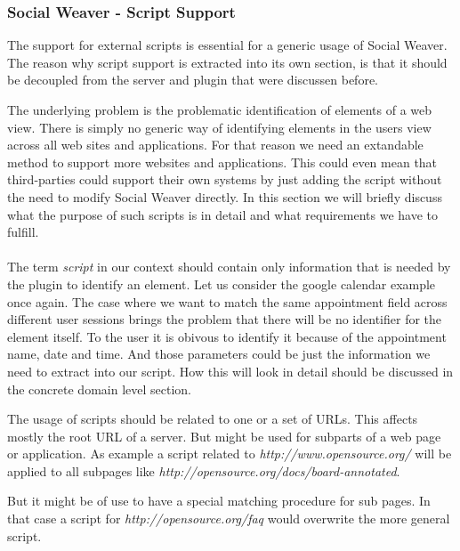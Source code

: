 
\subsubsection{Social Weaver - Script Support}
The support for external scripts is essential for a generic usage of Social Weaver. The reason why script support is extracted into its own section, is that it should be decoupled from the server and plugin that were discussen before. 

The underlying problem is the problematic identification of elements of a web view. There is simply no generic way of identifying elements in the users view across all web sites and applications. For that reason we need an extandable method to support more websites and applications. This could even mean that third-parties could support their own systems by just adding the script without the need to modify Social Weaver directly. In this section we will briefly discuss what the purpose of such scripts is in detail and what requirements we have to fulfill. 
\\ \\
The term \textit{script} in our context should contain only information that is needed by the plugin to identify an element. Let us consider the google calendar example once again. The case where we want to match the same appointment field across different user sessions brings the problem that there will be no identifier for the element itself. To the user it is obivous to identify it because of the appointment name, date and time. And those parameters could be just the information we need to extract into our script. How this will look in detail should be discussed in the concrete domain level section. 

The usage of scripts should be related to one or a set of URLs. This affects mostly the root URL of a server. But might be used for subparts of a web page or application. As example a script related to \textit{http://www.opensource.org/} will be applied to all subpages like \textit{http://opensource.org/docs/board-annotated}. 

But it might be of use to have a special matching procedure for sub pages.  In that case a script for \textit{http://opensource.org/faq} would overwrite the more general script. 

